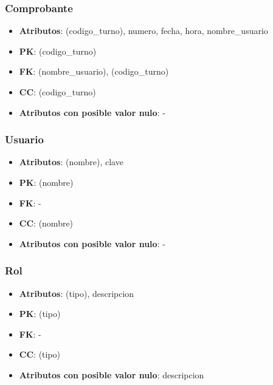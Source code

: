 \documentclass[a4paper,11pt]{article}
\begin{document}
\subsubsection{\textbf{Comprobante}}

\begin{itemize}

\item 
\textbf{Atributos}: (codigo\_turno), numero, fecha, hora, nombre\_usuario

\item 
\textbf{PK}: (codigo\_turno)

\item
\textbf{FK}:  (nombre\_usuario), (codigo\_turno)

\item 
\textbf{CC}: (codigo\_turno)

\item 
\textbf{Atributos con posible valor nulo}: -

\end{itemize}
\subsubsection{\textbf{Usuario}}

\begin{itemize}

\item 
\textbf{Atributos}: (nombre), clave

\item 
\textbf{PK}: (nombre)

\item
\textbf{FK}: - 

\item 
\textbf{CC}: (nombre)

\item 
\textbf{Atributos con posible valor nulo}: -
\end{itemize}
\subsubsection{\textbf{Rol}}

\begin{itemize}

\item 
\textbf{Atributos}: (tipo), descripcion

\item 
\textbf{PK}: (tipo)

\item
\textbf{FK}: - 

\item 
\textbf{CC}: (tipo)

\item 
\textbf{Atributos con posible valor nulo}: descripcion

\end{itemize}
\end{document}
